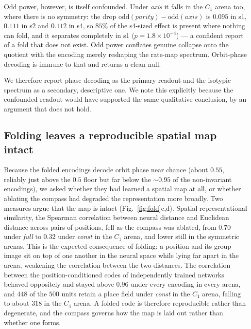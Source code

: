 \documentclass[9pt,lineno]{elife}
\begin{document}
Odd power, however, is itself confounded. Under \textit{axis} it falls in the $C_1$ arena too,
where there is no symmetry: the drop $\mathrm{odd}(\textit{parity}) - \mathrm{odd}(\textit{axis})$
is $0.095$ in s1, $0.111$ in s2 and $0.112$ in s4, so $85\%$ of the s4-sized effect is present
where nothing can fold, and it separates completely in s1 ($p = 1.8\times10^{-4}$) --- a
confident report of a fold that does not exist. Odd power conflates genuine collapse onto the quotient with the encoding merely
reshaping the rate-map spectrum. Orbit-phase decoding is immune to that and returns a clean null.

We therefore report phase decoding as the primary readout and the isotypic spectrum as a
secondary, descriptive one. We note this explicitly because the confounded readout would have
supported the same qualitative conclusion, by an argument that does not hold.

\subsection{Folding leaves a reproducible spatial map intact}

Because the folded encodings decode orbit phase near chance (about $0.55$, reliably just above
the $0.5$ floor but far below the $\sim\!0.95$ of the non-invariant encodings), we asked whether they had learned a
spatial map at all, or whether ablating the compass had degraded the representation more
broadly. Two measures argue that the map is intact (Fig.~\ref{fig:fold}c,d). Spatial
representational similarity, the Spearman correlation between neural distance and Euclidean
distance across pairs of positions, fell as the compass was ablated, from $0.70$ under
\textit{full} to $0.32$ under \textit{const} in the $C_1$ arena, and lower still in the
symmetric arenas. This is the expected consequence of folding: a position and its group image
sit on top of one another in the neural space while lying far apart in the arena, weakening the
correlation between the two distances. The correlation between the position-conditioned codes of
independently trained networks behaved oppositely and stayed above $0.96$ under every encoding
in every arena, and $448$ of the $500$ units retain a place field under \textit{const} in the
$C_1$ arena, falling to about $318$ in the $C_4$ arena. A folded code is therefore reproducible rather than degenerate, and the compass
governs how the map is laid out rather than whether one forms.
\end{document}
